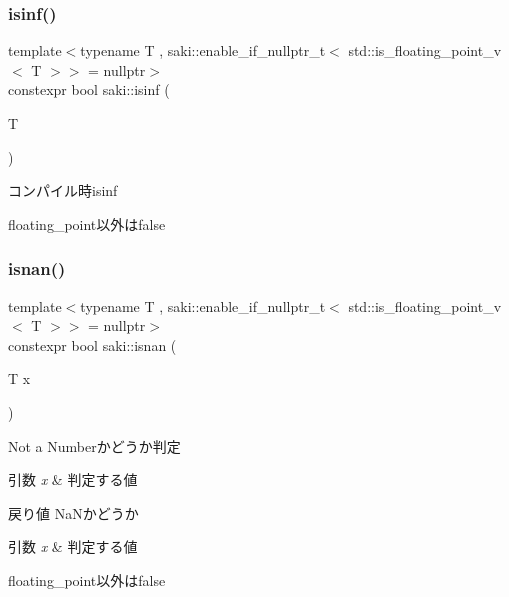 \subsubsection{\texorpdfstring{isinf()}{isinf()}}
{\footnotesize\ttfamily template$<$typename T , saki\+::enable\+\_\+if\+\_\+nullptr\+\_\+t$<$ std\+::is\+\_\+floating\+\_\+point\+\_\+v$<$ T $>$$>$  = nullptr$>$ \\
constexpr bool saki\+::isinf (\begin{DoxyParamCaption}\item[{T}]{ }\end{DoxyParamCaption})}



コンパイル時isinf 

floating\+\_\+point以外はfalse \mbox{\label{namespacesaki_a446ca3f39e4dc8e57db4aafa03a4e232}} 
\subsubsection{\texorpdfstring{isnan()}{isnan()}}
{\footnotesize\ttfamily template$<$typename T , saki\+::enable\+\_\+if\+\_\+nullptr\+\_\+t$<$ std\+::is\+\_\+floating\+\_\+point\+\_\+v$<$ T $>$$>$  = nullptr$>$ \\
constexpr bool saki\+::isnan (\begin{DoxyParamCaption}\item[{T}]{x }\end{DoxyParamCaption})}



Not a Numberかどうか判定 


\begin{DoxyParams}{引数}
{\em x} & 判定する値 \\
\hline
\end{DoxyParams}
\begin{DoxyReturn}{戻り値}
Na\+Nかどうか
\end{DoxyReturn}

\begin{DoxyParams}{引数}
{\em x} & 判定する値\\
\hline
\end{DoxyParams}
floating\+\_\+point以外はfalse \mbox{\label{namespacesaki_a03b7a22945dcbce6e2bb0593025c90c4}} 
